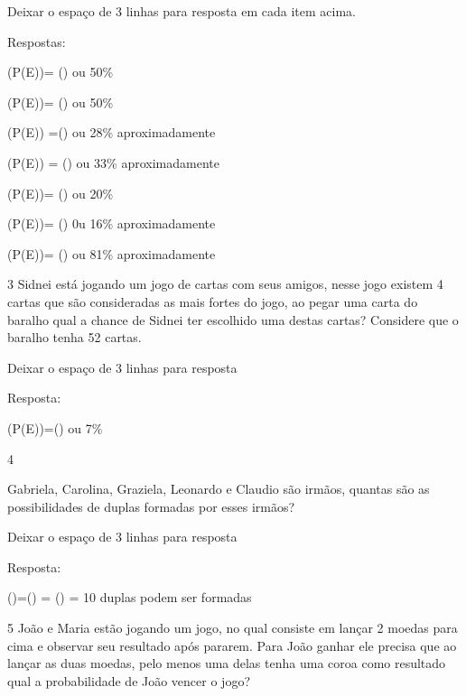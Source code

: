 Deixar o espaço de 3 linhas para resposta em cada item acima.

Respostas:

\item 

(P(E))= () ou 50\%

\item 

(P(E))= () ou 50\%

\item 

(P(E)) =() ou 28\% aproximadamente

\item 

(P(E)) = () ou 33\% aproximadamente

\item 

(P(E))= () ou 20\%

\item 

(P(E))= () 0u 16\% aproximadamente

\item 

(P(E))= () ou 81\% aproximadamente

\num{3} Sidnei está jogando um jogo de cartas com seus amigos, nesse jogo
existem 4 cartas que são consideradas as mais fortes do jogo, ao pegar
uma carta do baralho qual a chance de Sidnei ter escolhido uma destas
cartas? Considere que o baralho tenha 52 cartas.

Deixar o espaço de 3 linhas para resposta

Resposta:

(P(E))=() ou 7\%

\num{4}

Gabriela, Carolina, Graziela, Leonardo e Claudio são irmãos, quantas são
as possibilidades de duplas formadas por esses irmãos?

Deixar o espaço de 3 linhas para resposta

Resposta:

()=() = () = 10
duplas podem ser formadas

\num{5} João e Maria estão jogando um jogo, no qual consiste em lançar 2
moedas para cima e observar seu resultado após pararem. Para João ganhar
ele precisa que ao lançar as duas moedas, pelo menos uma delas tenha uma
coroa como resultado qual a probabilidade de João vencer o jogo?

